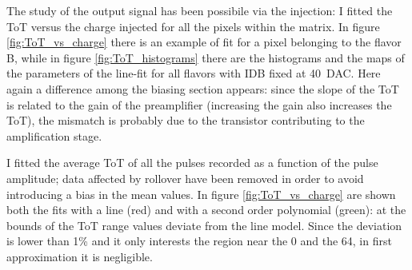         The study of the output signal has been possibile via the injection: I fitted the ToT versus the charge injected for all the pixels within the matrix.
        In figure \ref{fig:ToT_vs_charge} there is an example of fit for a pixel belonging to the flavor B, while in figure \ref{fig:ToT_histograms} there are the histograms and the maps of the parameters of the line-fit for all flavors with IDB fixed at \SI{40}{DAC}. Here again a difference among the biasing section appears: since the slope of the ToT is related to the gain of the preamplifier (increasing the gain also increases the ToT), the mismatch is probably due to the transistor contributing to the amplification stage.

        I fitted the average ToT of all the pulses recorded as a function of the pulse amplitude; data affected by rollover have been removed in order to avoid introducing a bias in the mean values.
        In figure \ref{fig:ToT_vs_charge} are shown both the fits with a line (red) and with a second order polynomial (green): at the bounds of the ToT range values deviate from the line model. Since the deviation is lower than 1\% and it only interests the region near the 0 and the 64, in first approximation it is negligible. 


